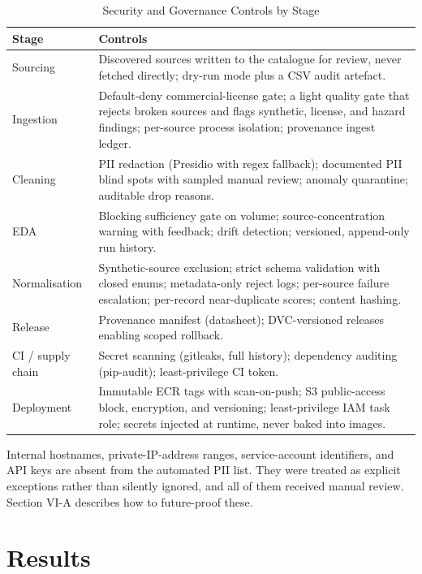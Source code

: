 \documentclass[conference]{IEEEtran}
\begin{document}
\begin{table}[t]
\caption{Security and Governance Controls by Stage}
\label{tab:security}
\centering
\renewcommand{\arraystretch}{1.2}
\begin{tabular}{|p{1.5cm}|p{6.1cm}|}
\hline
Stage & Controls \\ \hline
Sourcing & Discovered sources written to the catalogue for review, never fetched directly; dry-run mode plus a CSV audit artefact. \\ \hline
Ingestion & Default-deny commercial-license gate; a light quality gate that rejects broken sources and flags synthetic, license, and hazard findings; per-source process isolation; provenance ingest ledger. \\ \hline
Cleaning & PII redaction (Presidio with regex fallback); documented PII blind spots with sampled manual review; anomaly quarantine; auditable drop reasons. \\ \hline
EDA & Blocking sufficiency gate on volume; source-concentration warning with feedback; drift detection; versioned, append-only run history. \\ \hline
Normalisation & Synthetic-source exclusion; strict schema validation with closed enums; metadata-only reject logs; per-source failure escalation; per-record near-duplicate scores; content hashing. \\ \hline
Release & Provenance manifest (datasheet); DVC-versioned releases enabling scoped rollback. \\ \hline
CI / supply chain & Secret scanning (gitleaks, full history); dependency auditing (pip-audit); least-privilege CI token. \\ \hline
Deployment & Immutable ECR tags with scan-on-push; S3 public-access block, encryption, and versioning; least-privilege IAM task role; secrets injected at runtime, never baked into images. \\ \hline
\end{tabular}
\end{table}


Internal hostnames, private-IP-address ranges, service-account identifiers, and API keys are absent from the automated PII list. They were treated as explicit exceptions rather than silently ignored, and all of them received manual review. Section VI-A describes how to future-proof these.

\section{Results}
\end{document}
